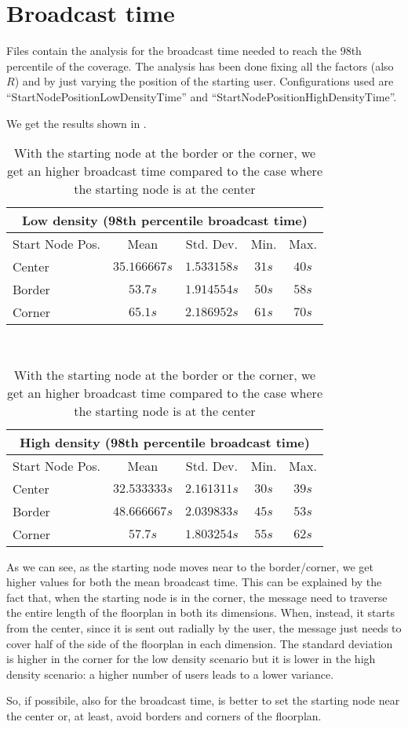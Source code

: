 \section{Broadcast time}\label{sec:startnodetime}

Files  contain the analysis for the
broadcast time needed to reach the 98th percentile of the coverage. The analysis
has been done fixing all the factors (also \(R\)) and by just varying the
position of the starting user. Configurations used are
``StartNodePositionLowDensityTime'' and ``StartNodePositionHighDensityTime''.

We get the results shown in .

\begin{table}[hbt]
	\centering
	\begin{tabular}{lcccc}
		\multicolumn{5}{c}{Low density (98th percentile broadcast time)}\\
		\toprule
		Start Node Pos\@. & Mean & Std\@. Dev\@. & Min\@. & Max\@. \\
		\midrule
		Center & \(35.166667s\) & \(1.533158s\) & \(31s\) & \(40s\) \\[16pt]
		Border & \(53.7s\) & \(1.914554s\) & \(50s\) & \(58s\) \\[16pt]
		Corner & \(65.1s\) & \(2.186952s\) & \(61s\) & \(70s\) \\
		\bottomrule
	\end{tabular}\\[16pt]
	\begin{tabular}{lcccc}
		\multicolumn{5}{c}{High density (98th percentile broadcast time)}\\
		\toprule
		Start Node Pos\@. & Mean & Std\@. Dev\@. & Min\@. & Max\@. \\
		\midrule
		Center & \(32.533333s\) & \(2.161311s\) & \(30s\) & \(39s\) \\[16pt]
		Border & \(48.666667s\) & \(2.039833s\) & \(45s\) & \(53s\) \\[16pt]
		Corner & \(57.7s\) & \(1.803254s\) & \(55s\) & \(62s\) \\
		\bottomrule
	\end{tabular}
	\caption{With the starting node at the border or the corner, we get an
	higher broadcast time compared to the case where the starting node is at
	the center}\label{table:startnodetimeresults}
\end{table}

As we can see, as the starting node moves near to the border/corner, we get
higher values for both the mean broadcast time. This can be explained by the
fact that, when the starting node is in the corner, the message need to traverse
the entire length of the floorplan in both its dimensions.  When, instead, it
starts from the center, since it is sent out radially by the user, the message
just needs to cover half of the side of the floorplan in each dimension. The
standard deviation is higher in the corner for the low density scenario but it
is lower in the high density scenario: a higher number of users leads to a lower
variance.

So, if possibile, also for the broadcast time, is better to set the starting
node near the center or, at least, avoid borders and corners of the floorplan.
